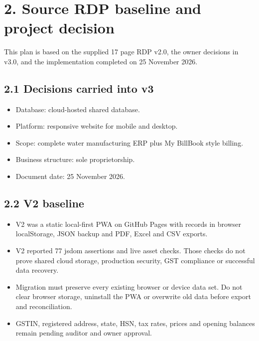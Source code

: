 \documentclass[11pt]{article}
\begin{document}
\section{2. Source RDP baseline and project decision}
This plan is based on the supplied 17 page RDP v2.0, the owner decisions in v3.0, and the implementation completed on 25 November 2026.
\subsection{2.1 Decisions carried into v3}
\begin{itemize}[leftmargin=*,itemsep=2pt,topsep=2pt]
\item Database: cloud-hosted shared database.
\item Platform: responsive website for mobile and desktop.
\item Scope: complete water manufacturing ERP plus My BillBook style billing.
\item Business structure: sole proprietorship.
\item Document date: 25 November 2026.
\end{itemize}
\subsection{2.2 V2 baseline}
\begin{itemize}[leftmargin=*,itemsep=2pt,topsep=2pt]
\item V2 was a static local-first PWA on GitHub Pages with records in browser localStorage, JSON backup and PDF, Excel and CSV exports.
\item V2 reported 77 jsdom assertions and live asset checks. Those checks do not prove shared cloud storage, production security, GST compliance or successful data recovery.
\item Migration must preserve every existing browser or device data set. Do not clear browser storage, uninstall the PWA or overwrite old data before export and reconciliation.
\item GSTIN, registered address, state, HSN, tax rates, prices and opening balances remain pending auditor and owner approval.
\end{itemize}
\end{document}

